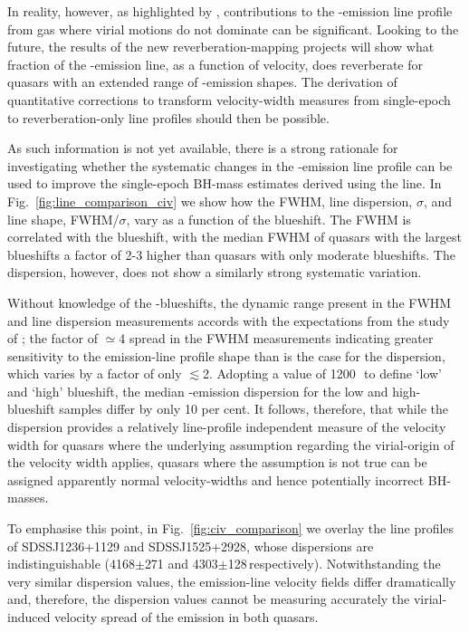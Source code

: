 In reality, however, as highlighted by \citet{denney12}, contributions to the -emission line profile from gas where virial motions do not dominate can be significant. 
Looking to the future, the results of the new reverberation-mapping projects \citep{shen15, kingoz15} will show what fraction of the -emission line, as a function of velocity, does reverberate for quasars with an extended range of -emission shapes. 
The derivation of quantitative corrections to transform velocity-width measures from single-epoch to reverberation-only line profiles should then be possible. 

As such information is not yet available, there is a strong rationale for investigating whether the systematic changes in the -emission line profile can be used to improve the single-epoch BH-mass estimates derived using the  line. 
In Fig.~\ref{fig:line_comparison_civ} we show how the  FWHM, line dispersion, $\sigma$, and line shape, FWHM/$\sigma$, vary as a function of the blueshift. 
The  FWHM is correlated with the blueshift, with the median FWHM of quasars with the largest blueshifts a factor of 2-3 higher than quasars with only moderate blueshifts.
The dispersion, however, does not show a similarly strong systematic variation. 

Without knowledge of the -blueshifts, the dynamic range present in the FWHM and line dispersion measurements accords with the expectations from the study of \citet{denney13}; the factor of $\simeq$4 spread in the FWHM measurements indicating greater sensitivity to the emission-line profile shape than is the case for the dispersion, which varies by a factor of only $\lesssim$2.
Adopting a value of 1200\,\kms\, to define `low' and `high' blueshift, the median -emission dispersion for the low and high-blueshift samples differ by only 10 per cent. 
It follows, therefore, that while the dispersion provides a relatively line-profile independent measure of the velocity width for quasars where the underlying assumption regarding the virial-origin of the velocity width applies, quasars where the assumption is not true can be assigned apparently normal velocity-widths and hence potentially incorrect BH-masses. 

To emphasise this point, in Fig.~\ref{fig:civ_comparison} we overlay the  line profiles of SDSSJ1236+1129 and SDSSJ1525+2928, whose dispersions are indistinguishable (4168$\pm$271 and 4303$\pm$128\,\kms respectively). 
Notwithstanding the very similar dispersion values, the emission-line velocity fields differ dramatically and, therefore, the dispersion values cannot be measuring accurately the virial-induced velocity spread of the  emission in both quasars.

